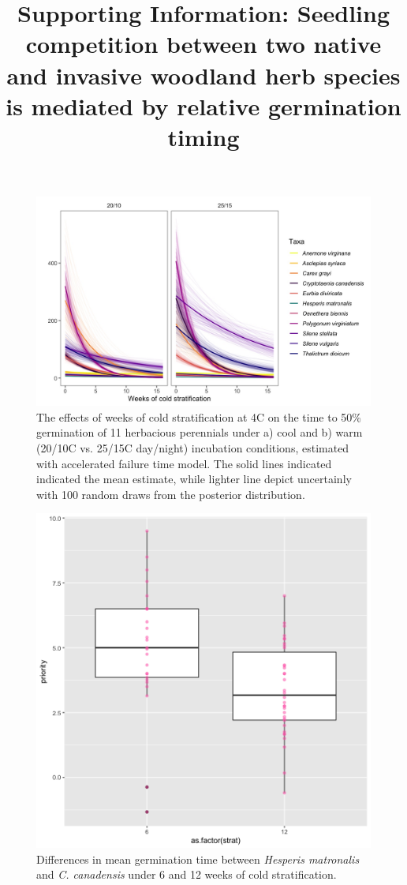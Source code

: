 \documentclass{article}
\title{Supporting Information: Seedling competition between two native %
and invasive %
woodland herb species is mediated by relative germination timing}
\date{}
\begin{document}



\maketitle

\begin{figure}[!ht]
    \centering
\includegraphics[width=\textwidth]{..//figure/AFTall.jpeg}
   \caption{The effects of weeks of cold stratification at 4\degree C on the time to 50\% germination of 11 herbacious perennials under a) cool and b) warm (20/10\degree C vs. 25/15\degree C day/night) incubation conditions, estimated with accelerated failure time model. The solid lines indicated indicated the mean estimate, while lighter line depict uncertainly with 100 random draws from the posterior distribution.} 
   \label{fig:AFTall}
\end{figure}

\begin{figure}[!ht]
    \centering
\includegraphics[width=.7\textwidth]{..//figure/priority_treat.png}
   \caption{Differences in mean germination time between \textit{Hesperis matronalis} and \textit{C. canadensis} under 6 and 12 weeks of cold stratification.} 
   \label{fig:MGTsup}
\end{figure}
\end{document}
